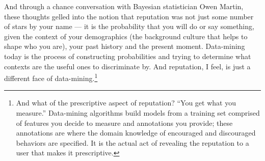 And through a chance conversation with Bayesian statistician
Owen Martin, these thoughts gelled into the notion that reputation
was not just some number of stars by your name --- it is the probability
that you will do or say something, given the context of your demographics
(\ie the background culture that helps to shape who you are),
your past history and the present moment.
Data-mining today is the process of constructing probabilities and
trying to determine what contexts are the useful ones to discriminate by.
And reputation, I feel, is just a different face of
data-mining.\footnote{And what of the prescriptive
aspect of reputation?  ``You get what you measure.'' Data-mining
algorithms build models from a training set comprised of
features you decide to measure and annotations you provide;
these annotations are where the domain knowledge of encouraged
and discouraged behaviors are specified.  It is the actual act
of revealing the reputation to a user that makes it prescriptive.}

